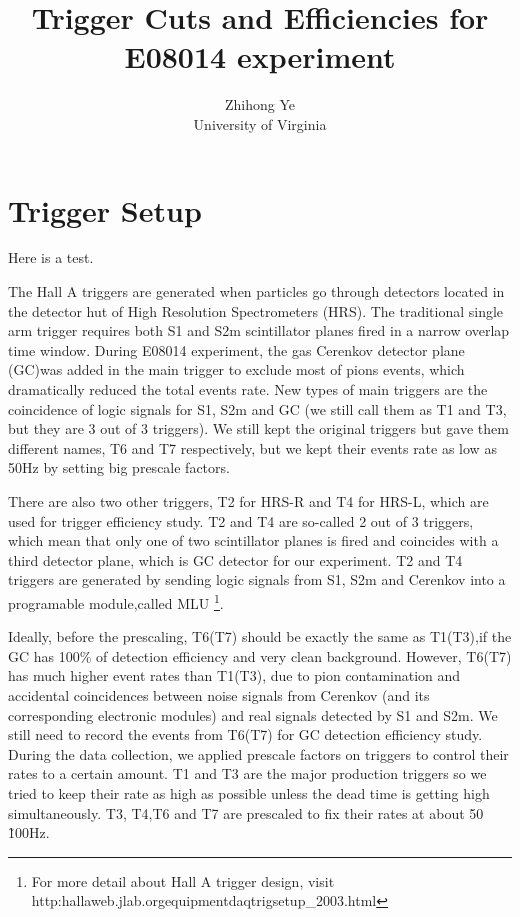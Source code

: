 \documentclass[a4paper,10.5pt]{article}
\title{Trigger Cuts and Efficiencies for E08014 experiment}
\author{Zhihong Ye\\
 University of Virginia
}
\begin{document}
\maketitle

\section{Trigger Setup}
 
  Here is a test.

  The Hall A triggers are generated when particles go through detectors located in the detector hut of High Resolution Spectrometers (HRS). The traditional single arm trigger requires both S1 and S2m scintillator planes fired in a narrow overlap time window. During E08014 experiment, the gas Cerenkov detector plane (GC)was added in the main trigger to exclude most of pions events, which dramatically reduced the total events rate. New types of main triggers are the coincidence of logic signals for S1, S2m and GC (we still call them as T1 and T3, but they are 3 out of 3 triggers). We still kept the original triggers but gave them different names, T6 and T7 respectively, but we kept their events rate as low as 50Hz by setting big prescale factors.

 There are also two other triggers, T2 for HRS-R and T4 for HRS-L, which are used for trigger efficiency study. T2 and T4 are so-called 2 out of 3 triggers, which mean that only one of two scintillator planes is fired and coincides with a third detector plane, which is GC detector for our experiment. T2 and T4 triggers are generated by sending logic signals from S1, S2m and Cerenkov into a programable module,called MLU \footnote{For more detail about Hall A trigger design, visit http:\/\/hallaweb.jlab.org\/equipment\/daq\/trigsetup\_2003.html}.

 Ideally, before the prescaling, T6(T7) should be exactly the same as T1(T3),if the GC has 100\% of detection efficiency and very clean background. However, T6(T7) has much higher event rates than T1(T3), due to pion contamination and accidental coincidences between noise signals from Cerenkov (and its corresponding electronic modules) and real signals detected by S1 and S2m. We still need to record the events from T6(T7) for GC detection efficiency study. During the data collection, we applied prescale factors on triggers to control their rates to a certain amount. T1 and T3 are the major production triggers so we tried to keep their rate as high as possible unless the dead time is getting high simultaneously. T3, T4,T6 and T7 are prescaled to fix their rates at about 50 \~ 100Hz.
\end{document}
